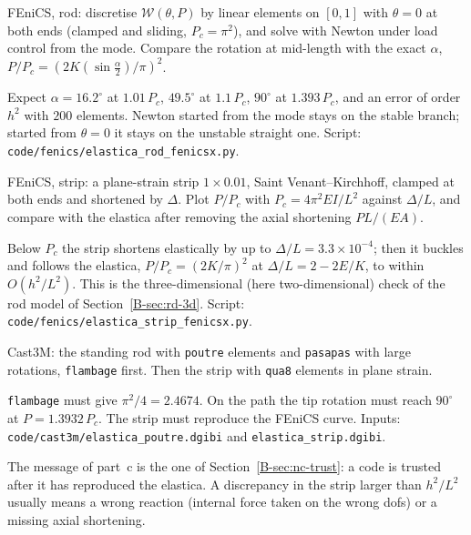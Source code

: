 \qc FEniCS, rod: discretise $\mathcal{W}(\theta,P)$ by linear elements on $[0,1]$ with $\theta = 0$ at
both ends (clamped and sliding, $P_c = \pi^2$), and solve with Newton under load control from the
mode. Compare the rotation at mid-length with the exact $\alpha$, $P/P_c = (2K(\sin\tfrac\alpha2)/\pi)^2$.
\begin{answer}
Expect $\alpha = 16.2^\circ$ at $1.01\,P_c$, $49.5^\circ$ at $1.1\,P_c$, $90^\circ$ at $1.393\,P_c$, and an error
of order $h^2$ with $200$ elements. Newton started from the mode stays on the stable branch;
started from $\theta = 0$ it stays on the unstable straight one. Script:
\texttt{code/fenics/elastica\_rod\_fenicsx.py}.
\end{answer}

\qc FEniCS, strip: a plane-strain strip $1\times0.01$, Saint Venant--Kirchhoff, clamped at both ends
and shortened by $\Delta$. Plot $P/P_c$ with $P_c = 4\pi^2EI/L^2$ against $\Delta/L$, and compare with the
elastica after removing the axial shortening $PL/(EA)$.
\begin{answer}
Below $P_c$ the strip shortens elastically by up to $\Delta/L = 3.3\times10^{-4}$; then it buckles and
follows the elastica, $P/P_c = (2K/\pi)^2$ at $\Delta/L = 2 - 2E/K$, to within $O(h^2/L^2)$. This is the
three-dimensional (here two-dimensional) check of the rod model of Section~\ref{B-sec:rd-3d}. Script:
\texttt{code/fenics/elastica\_strip\_fenicsx.py}.
\end{answer}

\qc Cast3M: the standing rod with \texttt{poutre} elements and \texttt{pasapas} with large rotations,
\texttt{flambage} first. Then the strip with \texttt{qua8} elements in plane strain.
\begin{answer}
\texttt{flambage} must give $\pi^2/4 = 2.4674$. On the path the tip rotation must reach $90^\circ$ at
$P = 1.3932\,P_c$. The strip must reproduce the FEniCS curve. Inputs: \texttt{code/cast3m/elastica\_poutre.dgibi}
and \texttt{elastica\_strip.dgibi}.
\end{answer}

\begin{instructor}
The message of part~c is the one of Section~\ref{B-sec:nc-trust}: a code is trusted after it has
reproduced the elastica. A discrepancy in the strip larger than $h^2/L^2$ usually means a wrong
reaction (internal force taken on the wrong dofs) or a missing axial shortening.
\end{instructor}
